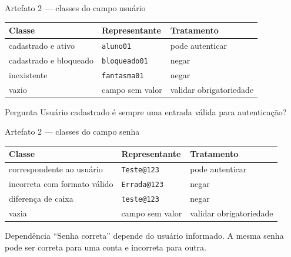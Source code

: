 \begin{frame}{Artefato 2 — classes do campo usuário}
  \small
  \begin{tabular}{p{34mm}p{39mm}p{37mm}}
    \toprule
    \textbf{Classe} & \textbf{Representante} & \textbf{Tratamento}\\
    \midrule
    cadastrado e ativo & \texttt{aluno01} & pode autenticar\\
    cadastrado e bloqueado & \texttt{bloqueado01} & negar\\
    inexistente & \texttt{fantasma01} & negar\\
    vazio & campo sem valor & validar obrigatoriedade\\
    \bottomrule
  \end{tabular}
  \vspace{5mm}

  \begin{block}{Pergunta}
    Usuário cadastrado é sempre uma entrada válida para autenticação?
  \end{block}
\end{frame}

\begin{frame}{Artefato 2 — classes do campo senha}
  \small
  \begin{tabular}{p{41mm}p{37mm}p{32mm}}
    \toprule
    \textbf{Classe} & \textbf{Representante} & \textbf{Tratamento}\\
    \midrule
    correspondente ao usuário & \texttt{Teste@123} & pode autenticar\\
    incorreta com formato válido & \texttt{Errada@123} & negar\\
    diferença de caixa & \texttt{teste@123} & negar\\
    vazia & campo sem valor & validar obrigatoriedade\\
    \bottomrule
  \end{tabular}
  \vspace{5mm}

  \begin{alertblock}{Dependência}
    ``Senha correta'' depende do usuário informado. A mesma senha pode ser correta
    para uma conta e incorreta para outra.
  \end{alertblock}
\end{frame}

